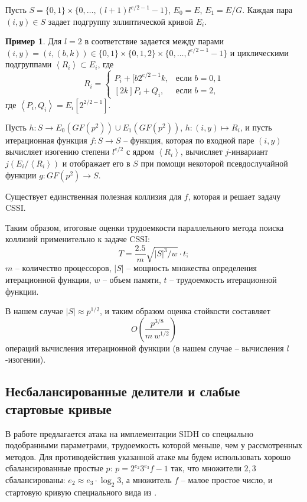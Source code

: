 \documentclass[a4paper,12pt]{article}
\newcommand{\tr}[1]{\left\langle #1\right\rangle}
\theoremstyle{definition}
\newtheorem{example}{Пример}
\begin{document}
Пусть $S=\{0,1\}\times\{0,\dots,(l+1)l^{e/2-1}-1\}$, $E_0=E$, $E_1=E/G$.  Каждая пара $(i,y)\in S$ задает подгруппу эллиптической кривой $E_i$. 
\begin{example}
 Для $l=2$ в \cite{Adj} соответствие задается между парами $(i,y)=(i,(b,k))\in\{0,1\}\times\{0,1,2\}\times \{0,\dots,l^{e/2-1}-1\}$ и 
 циклическими подгруппами $\tr{R_i}\subset E_i$, где
 \begin{equation*}
R_i = 
 \begin{cases}
   P_i+[b2^{e/2-1}k,  &\text{если } b=0,1 \\
   [2k]P_i+Q_i,  &\text{если } b=2,
 \end{cases}
\end{equation*}
где $\tr{P_i,Q_i} = E_i[2^{2/2-1}]$.
\end{example}

Пусть $h:S\to E_0(GF(p^2))\cup E_1(GF(p^2))$, $h:(i,y)\mapsto R_i$, и  пусть итерационная функция $f:S\to S$ -- функция, которая по входной паре $(i,y)$
вычисляет изогению степени $l^{e/2}$ с ядром $\tr{R_i}$, вычисляет $j$-инвариант $j(E_i/\tr{R_i})$ и отображает его в $S$ при помощи некоторой псевдослучайной
функции $g: GF(p^2)\to S$.

Существует единственная полезная коллизия для $f$, которая и решает задачу CSSI.

Таким образом, итоговые оценки трудоемкости параллельного метода поиска коллизий применительно к задаче CSSI:
\begin{equation}\label{eq1}
T=\frac{2.5}{m}\sqrt{|S|^3/w}\cdot t;
\end{equation}
$m$ -- количество процессоров, $|S|$ -- мощность множества определения итерационной функции, $w$ -- объем памяти, $t$ -- трудоемкость итерационной функции.

В нашем случае $|S|\approx p^{1/2}$, и таким образом оценка стойкости составляет
\begin{equation}\label{eq2} 
O\left(\frac{p^{3/8}}{m\ w^{1/2}}\right)
\end{equation}
операций вычисления итерационной функции (в нашем случае -- вычисления $l$-изогении).

\subsection*{Несбалансированные делители и слабые стартовые кривые}


В работе \cite{Kutas} предлагается атака на имплементации SIDH со специально  подобранными параметрами, трудоемкость которой меньше, чем у рассмотренных методов.
Для противодействия указанной атаке мы будем использовать хорошо сбалансированные простые $p$: $p=2^{e_2}3^{e_3}f-1$ так, что множители $2,3$ сбалансированы: 
$e_2\approx e_3 \cdot \log_2 3$, а множитель $f$ -- малое простое число,
и стартовую кривую специального вида из \cite{StartingCurve}.
\end{document}
